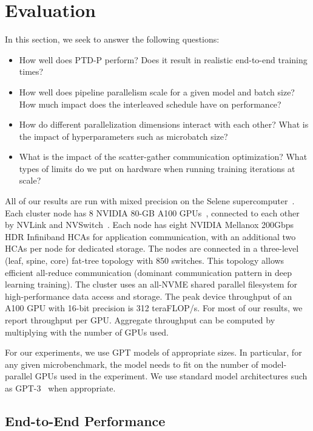 \section{Evaluation}

In this section, we seek to answer the following questions:

\begin{itemize}
    \item How well does PTD-P perform? Does it result in realistic end-to-end training times?
    \item How well does pipeline parallelism scale for a given model and batch size? How much impact does the interleaved schedule have on performance?
    \item How do different parallelization dimensions interact with each other? What is the impact of hyperparameters such as microbatch size?
    \item What is the impact of the scatter-gather communication optimization? What types of limits do we put on hardware when running training iterations at scale?
\end{itemize}

All of our results are run with mixed precision on the Selene supercomputer~\cite{selene}. Each cluster node has 8 NVIDIA 80-GB A100 GPUs~\cite{a100}, connected to each other by NVLink and NVSwitch~\cite{nvlink}. Each node has eight NVIDIA Mellanox 200Gbps HDR Infiniband HCAs for application communication, with an additional two HCAs per node for dedicated storage. The nodes are connected in a three-level (leaf, spine, core) fat-tree topology with 850 switches. This topology allows efficient all-reduce communication (dominant communication pattern in deep learning training). The cluster uses an all-NVME shared parallel filesystem for high-performance data access and storage. The peak device throughput of an A100 GPU with 16-bit precision is 312 teraFLOP/s. For most of our results, we report throughput per GPU. Aggregate throughput can be computed by multiplying with the number of GPUs used.

For our experiments, we use GPT models of appropriate sizes. In particular, for any given microbenchmark, the model needs to fit on the number of model-parallel GPUs used in the experiment. We use standard model architectures such as GPT-3~\cite{gpt3} when appropriate.

\subsection{End-to-End Performance}

